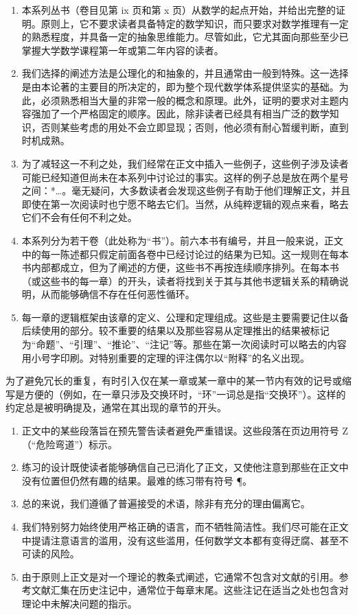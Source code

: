 
\begin{enumerate}
\def\labelenumi{\arabic{enumi}.}
\item
  本系列丛书（卷目见第 ix 页和第 x 页）从数学的起点开始，并给出完整的证明。原则上，它不要求读者具备特定的数学知识，而只要求对数学推理有一定的熟悉程度，并具备一定的抽象思维能力。尽管如此，它尤其面向那些至少已掌握大学数学课程第一年或第二年内容的读者。
\item
  我们选择的阐述方法是公理化的和抽象的，并且通常由一般到特殊。这一选择是由本论著的主要目的所决定的，即为整个现代数学体系提供坚实的基础。为此，必须熟悉相当大量的非常一般的概念和原理。此外，证明的要求对主题内容强加了一个严格固定的顺序。因此，除非读者已经具有相当广泛的数学知识，否则某些考虑的用处不会立即显现；否则，他必须有耐心暂缓判断，直到时机成熟。
\item
  为了减轻这一不利之处，我们经常在正文中插入一些例子，这些例子涉及读者可能已经知道但尚未在本系列中讨论过的事实。这样的例子总是放在两个星号之间：*\ldots*。毫无疑问，大多数读者会发现这些例子有助于他们理解正文，并且即使在第一次阅读时也宁愿不略去它们。当然，从纯粹逻辑的观点来看，略去它们不会有任何不利之处。
\item
  本系列分为若干卷（此处称为“书”）。前六本书有编号，并且一般来说，正文中的每一陈述都只假定前面各卷中已经讨论过的结果为已知。这一规则在每本书内部都成立，但为了阐述的方便，这些书不再按连续顺序排列。在每本书（或这些书的每一章）的开头，读者将找到关于其与其他书逻辑关系的精确说明，从而能够确信不存在任何恶性循环。
\item
  每一章的逻辑框架由该章的定义、公理和定理组成。这些是主要需要记住以备后续使用的部分。较不重要的结果以及那些容易从定理推出的结果被标记为“命题”、“引理”、“推论”、“注记”等。那些在第一次阅读时可以略去的内容用小号字印刷。对特别重要的定理的评注偶尔以“附释”的名义出现。
\end{enumerate}

为了避免冗长的重复，有时引入仅在某一章或某一章中的某一节内有效的记号或缩写是方便的（例如，在一章只涉及交换环时，“环”一词总是指“交换环”）。这样的约定总是被明确提及，通常在其出现的章节的开头。

\begin{enumerate}
\def\labelenumi{\arabic{enumi}.}
\setcounter{enumi}{5}
\item
  正文中的某些段落旨在预先警告读者避免严重错误。这些段落在页边用符号 Z（“危险弯道”）标示。
\item
  练习的设计既使读者能够确信自己已消化了正文，又使他注意到那些在正文中没有位置但仍然有趣的结果。最难的练习带有符号 ¶。
\item
  总的来说，我们遵循了普遍接受的术语，除非有充分的理由偏离它。
\item
  我们特别努力始终使用严格正确的语言，而不牺牲简洁性。我们尽可能在正文中提请注意语言的滥用，没有这些滥用，任何数学文本都有变得迂腐、甚至不可读的风险。
\item
  由于原则上正文是对一个理论的教条式阐述，它通常不包含对文献的引用。参考文献汇集在历史注记中，通常位于每章末尾。这些注记在适当之处也包含对理论中未解决问题的指示。
\end{enumerate}

